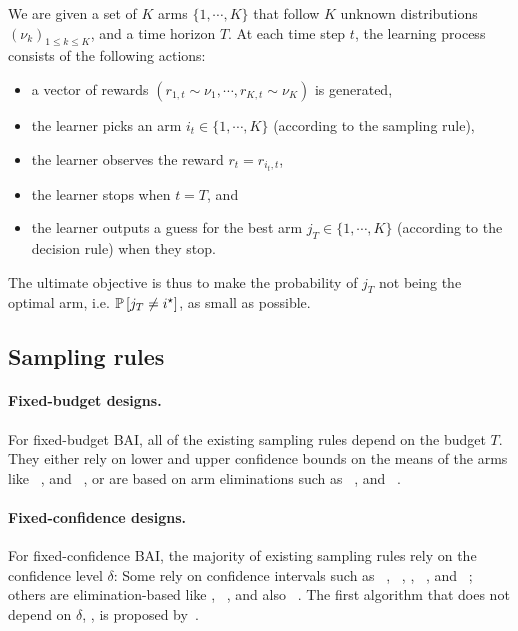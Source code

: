 \begin{definition}\label{def:mab.bai_budget}
\begin{leftbar}[defnbar]
	We are given a set of $K$ arms $\{1,\cdots,K\}$ that follow $K$ unknown distributions $(\nu_k)_{1 \leq k \leq K}$, and a time horizon $T$. At each time step $t$, the learning process consists of the following actions:
\begin{itemize}
	\item a vector of rewards $(r_{1,t} \sim \nu_1, \cdots, r_{K,t} \sim \nu_K)$ is generated,
	\item the learner picks an arm $i_t \in \{1,\cdots,K\}$ (according to the sampling rule),
	\item the learner observes the reward $r_t = r_{i_t, t}$,
	\item the learner stops when $t=T$, and
	\item the learner outputs a guess for the best arm $j_T \in \{1,\cdots,K\}$ (according to the decision rule) when they stop.
\end{itemize}
\end{leftbar}
\end{definition}

The ultimate objective is thus to make the probability of $j_T$ not being the optimal arm, i.e. $\mathbb{P}\left[j_T\neq i^{\star}\right]$, as small as possible.

\subsection{Sampling rules}\label{sec:mab.bai.sampling}

\paragraph{Fixed-budget designs.}

For fixed-budget BAI, all of the existing sampling rules depend on the budget $T$. They either rely on lower and upper confidence bounds on the means of the arms like \UCBE~\citep{audibert2010budget}, and \UGapE~\citep{gabillon2012ugape}, or are based on arm eliminations such as \SR~\citep{audibert2010budget}, and \SHA~\citep{karnin2013sha}.

\paragraph{Fixed-confidence designs.}

For fixed-confidence BAI, the majority of existing sampling rules rely on the confidence level $\delta$: Some rely on confidence intervals such as \LUCB~\citep{kalyanakrishnan2012lucb}, \UGapE~\citep{gabillon2012ugape}, \KLLUCB, \KLRacing~\citep{kaufmann2013kl}, and \LIL~\citep{jamieson2014lilucb}; others are elimination-based like \SE, \ME~\citep{even-dar2003confidence}, and also \EGE~\citep{karnin2013sha}. The first algorithm that does not depend on $\delta$, \Track, is proposed by~\cite{garivier2016tracknstop}.

